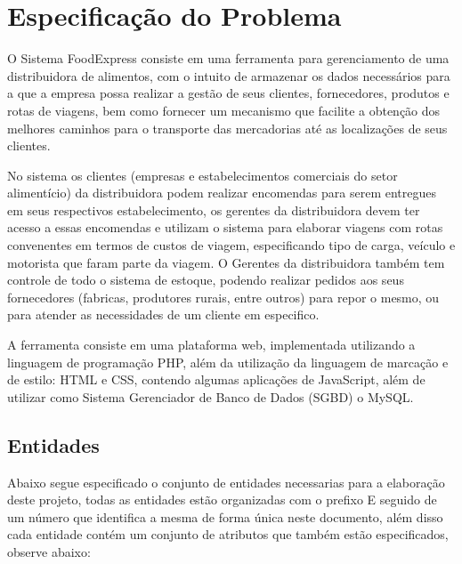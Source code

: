 \documentclass[12pt, onecolumn, titlepage]{article}
\begin{document}
\section{Especificação do Problema}
\label{sect:especificacao}

O Sistema FoodExpress consiste em uma ferramenta para gerenciamento de uma distribuidora de alimentos, com o intuito de armazenar os dados necessários para a que a empresa possa realizar a gestão de seus clientes, fornecedores, produtos e rotas de viagens, bem como fornecer um mecanismo que facilite a obtenção dos melhores caminhos para o transporte das mercadorias até as localizações de seus clientes.

No sistema os clientes (empresas e estabelecimentos comerciais do setor alimentício) da distribuidora podem realizar encomendas para serem entregues em seus respectivos estabelecimento, os gerentes da distribuidora devem ter acesso a essas encomendas e utilizam o sistema para elaborar viagens com rotas convenentes em termos de custos de viagem, especificando tipo de carga, veículo e motorista que faram parte da viagem. O Gerentes da distribuidora também tem controle de todo o sistema de estoque, podendo realizar pedidos aos seus fornecedores (fabricas, produtores rurais, entre outros) para repor o mesmo, ou para atender as necessidades de um cliente em especifico.

A ferramenta consiste em uma plataforma web, implementada utilizando a linguagem de programação PHP, além da utilização da linguagem de marcação e de estilo: HTML e CSS, contendo algumas aplicações de JavaScript, além de utilizar como Sistema Gerenciador de Banco de Dados (SGBD) o MySQL.

\subsection{Entidades}
\label{sect:entidades}

Abaixo segue especificado o conjunto de entidades necessarias para a elaboração deste projeto, todas as entidades estão organizadas com o prefixo E seguido de um número que identifica a mesma de forma única neste documento, além disso cada entidade contém um conjunto de atributos que também estão especificados, observe abaixo:
\end{document}
